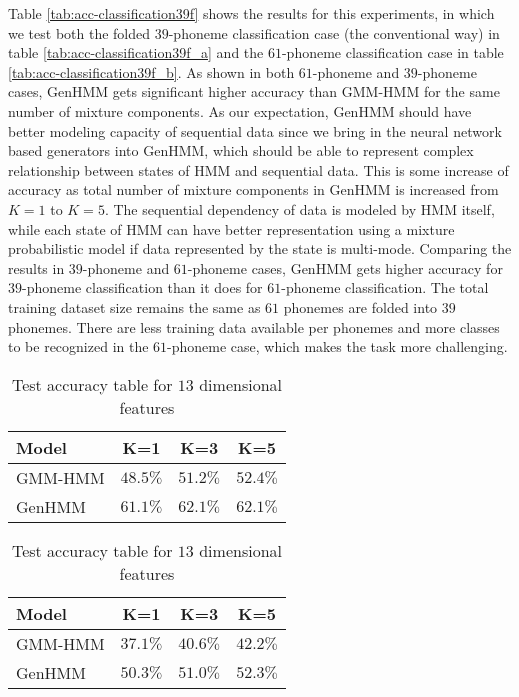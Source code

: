 \documentclass[letterpaper]{article} %
\begin{document}
Table \ref{tab:acc-classification39f} shows the results for this experiments, in which we test both the folded $39$-phoneme classification case (the conventional way) in table \ref{tab:acc-classification39f_a} and the $61$-phoneme classification case in table \ref{tab:acc-classification39f_b}. As shown in both $61$-phoneme and $39$-phoneme cases, GenHMM gets significant higher accuracy than GMM-HMM for the same number of mixture components. As our expectation, GenHMM should have better modeling capacity of sequential data since we bring in the neural network based generators into GenHMM, which should be able to represent complex relationship between states of HMM and sequential data. This is some increase of accuracy as total number of mixture components in GenHMM is increased from $K=1$ to $K=5$. The sequential dependency of data is modeled by HMM itself, while each state of HMM can have better representation using a mixture probabilistic model if data represented by the state is multi-mode. Comparing the results in $39$-phoneme and $61$-phoneme cases, GenHMM gets higher accuracy for $39$-phoneme classification than it does for $61$-phoneme classification. The total training dataset size remains the same as $61$ phonemes are folded into $39$ phonemes. There are less training data available per phonemes and more classes to be recognized in the $61$-phoneme case, which makes the task more challenging.

\begin{table}
  \caption{Test accuracy table for $13$ dimensional features }
  \label{tab:acc-classification13f}
  \vspace{-0.3cm}
  \centering
  \label{tab:acc-classification13f_a}
  \vspace{-0.1cm}
  \centering  
  \begin{tabular}{l|c|c|c}
    \toprule
    {Model} &  K=1 &  K=3 &  K=5  \\  \midrule
    GMM-HMM & $48.5\%$ &  $51.2\%$ &  $52.4\%$  \\ \midrule
    GenHMM & $61.1\%$ & $62.1\%$ & $62.1\%$   \\ 
    \bottomrule                                                                  
  \end{tabular}
  \vspace{0.1cm}
  \label{tab:acc-classification13f_b}
  \vspace{-0.1cm}
  \begin{tabular}{l|c|c|c}
    \toprule
    {Model} &  K=1 &  K=3 &  K=5
    \\ \midrule
    GMM-HMM & $37.1\%$ &  $40.6\%$ & $42.2\%$  \\ \midrule
    GenHMM & $50.3\%$ & $51.0\%$ & $52.3\%$   \\ 
    \bottomrule
  \end{tabular}
  \vspace{0.2cm}
\end{table}
\end{document}
